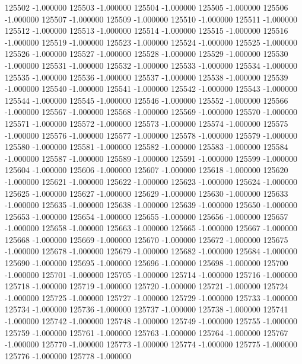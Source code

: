 125502   -1.000000
125503   -1.000000
125504   -1.000000
125505   -1.000000
125506   -1.000000
125507   -1.000000
125509   -1.000000
125510   -1.000000
125511   -1.000000
125512   -1.000000
125513   -1.000000
125514   -1.000000
125515   -1.000000
125516   -1.000000
125519   -1.000000
125523   -1.000000
125524   -1.000000
125525   -1.000000
125526   -1.000000
125527   -1.000000
125528   -1.000000
125529   -1.000000
125530   -1.000000
125531   -1.000000
125532   -1.000000
125533   -1.000000
125534   -1.000000
125535   -1.000000
125536   -1.000000
125537   -1.000000
125538   -1.000000
125539   -1.000000
125540   -1.000000
125541   -1.000000
125542   -1.000000
125543   -1.000000
125544   -1.000000
125545   -1.000000
125546   -1.000000
125552   -1.000000
125566   -1.000000
125567   -1.000000
125568   -1.000000
125569   -1.000000
125570   -1.000000
125571   -1.000000
125572   -1.000000
125573   -1.000000
125574   -1.000000
125575   -1.000000
125576   -1.000000
125577   -1.000000
125578   -1.000000
125579   -1.000000
125580   -1.000000
125581   -1.000000
125582   -1.000000
125583   -1.000000
125584   -1.000000
125587   -1.000000
125589   -1.000000
125591   -1.000000
125599   -1.000000
125604   -1.000000
125606   -1.000000
125607   -1.000000
125618   -1.000000
125620   -1.000000
125621   -1.000000
125622   -1.000000
125623   -1.000000
125624   -1.000000
125625   -1.000000
125627   -1.000000
125629   -1.000000
125630   -1.000000
125633   -1.000000
125635   -1.000000
125638   -1.000000
125639   -1.000000
125650   -1.000000
125653   -1.000000
125654   -1.000000
125655   -1.000000
125656   -1.000000
125657   -1.000000
125658   -1.000000
125663   -1.000000
125665   -1.000000
125667   -1.000000
125668   -1.000000
125669   -1.000000
125670   -1.000000
125672   -1.000000
125675   -1.000000
125678   -1.000000
125679   -1.000000
125682   -1.000000
125684   -1.000000
125690   -1.000000
125695   -1.000000
125696   -1.000000
125698   -1.000000
125700   -1.000000
125701   -1.000000
125705   -1.000000
125714   -1.000000
125716   -1.000000
125718   -1.000000
125719   -1.000000
125720   -1.000000
125721   -1.000000
125724   -1.000000
125725   -1.000000
125727   -1.000000
125729   -1.000000
125733   -1.000000
125734   -1.000000
125736   -1.000000
125737   -1.000000
125738   -1.000000
125741   -1.000000
125742   -1.000000
125748   -1.000000
125749   -1.000000
125755   -1.000000
125759   -1.000000
125761   -1.000000
125763   -1.000000
125764   -1.000000
125767   -1.000000
125770   -1.000000
125773   -1.000000
125774   -1.000000
125775   -1.000000
125776   -1.000000
125778   -1.000000
